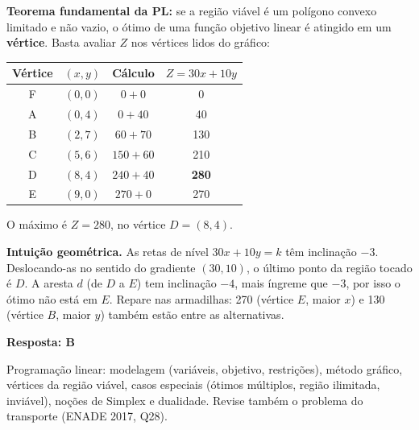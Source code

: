 \documentclass[11pt,a4paper]{article}
\newcommand{\solucao}{\par\medskip\noindent{\large\bfseries\color{verde}Solução}\par\smallskip}
\newcommand{\resposta}[1]{\begin{gabarito}\textbf{Resposta: #1}\end{gabarito}}
\begin{document}
\solucao
\textbf{Teorema fundamental da PL:} se a região viável é um polígono convexo limitado e não vazio, o
ótimo de uma função objetivo linear é atingido em um \textbf{vértice}. Basta avaliar $Z$ nos vértices
lidos do gráfico:
\begin{center}
\begin{tabular}{@{}cccc@{}}
\toprule
Vértice & $(x, y)$ & Cálculo & $Z = 30x + 10y$\\
\midrule
F & $(0, 0)$ & $0 + 0$     & 0\\
A & $(0, 4)$ & $0 + 40$    & 40\\
B & $(2, 7)$ & $60 + 70$   & 130\\
C & $(5, 6)$ & $150 + 60$  & 210\\
D & $(8, 4)$ & $240 + 40$  & \textbf{280}\\
E & $(9, 0)$ & $270 + 0$   & 270\\
\bottomrule
\end{tabular}
\end{center}
O máximo é $Z = 280$, no vértice $D = (8, 4)$.

\textbf{Intuição geométrica.} As retas de nível $30x + 10y = k$ têm inclinação $-3$. Deslocando-as no
sentido do gradiente $(30, 10)$, o último ponto da região tocado é $D$. A aresta $d$ (de $D$ a $E$) tem
inclinação $-4$, mais íngreme que $-3$, por isso o ótimo não está em $E$. Repare nas armadilhas:
270 (vértice $E$, maior $x$) e 130 (vértice $B$, maior $y$) também estão entre as alternativas.

\resposta{B}

\begin{dica}
Programação linear: modelagem (variáveis, objetivo, restrições), método gráfico, vértices da região viável,
casos especiais (ótimos múltiplos, região ilimitada, inviável), noções de Simplex e dualidade.
Revise também o problema do transporte (ENADE 2017, Q28).
\end{dica}

\end{document}
